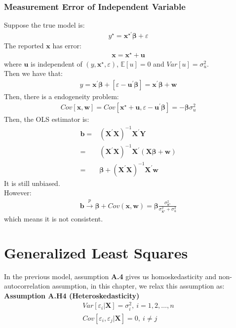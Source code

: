 \documentclass{article}
\begin{document}
\subsubsection{Measurement Error of Independent Variable}
Suppose the true model is:
	\begin{align*}
		y^\star = \boldsymbol{x}^{\star\prime} \boldsymbol{\beta} + \varepsilon
	\end{align*}
The reported $\boldsymbol{x}$ has error:
	\begin{align*}
		\boldsymbol{x} = \boldsymbol{x}^\star + \boldsymbol{u}
	\end{align*}
where $\boldsymbol{u}$ is independent of $(y, \boldsymbol{x}^\star, \varepsilon)$, $\mathbb{E}[u] = 0$ and $Var[u] = \sigma^2_u$.\\
Then we have that:
	\begin{align*}
		y = \boldsymbol{x}^\prime \boldsymbol{\beta} + [\varepsilon - \boldsymbol{u}^\prime \boldsymbol{\beta}] = \boldsymbol{x}^\prime \boldsymbol{\beta} + \boldsymbol{w}
	\end{align*}
Then, there is a endogeneity problem:
	\begin{align*}
		Cov[\boldsymbol{x}, \boldsymbol{w}] = Cov[\boldsymbol{x}^\star + \boldsymbol{u}, \varepsilon - \boldsymbol{u}^\prime \boldsymbol{\beta}] = -\boldsymbol{\beta} \sigma^2_u
	\end{align*}
Then, the OLS estimator is:
	\begin{align*}
		\boldsymbol{b} = &(\boldsymbol{X}^\prime \boldsymbol{X})^{-1} \boldsymbol{X}^\prime \boldsymbol{Y}\\ = &
		(\boldsymbol{X}^\prime \boldsymbol{X})^{-1} \boldsymbol{X}^\prime (\boldsymbol{X} \boldsymbol{\beta} + \boldsymbol{w})\\ = &
		\boldsymbol{\beta} + (\boldsymbol{X}^\prime \boldsymbol{X})^{-1} \boldsymbol{X}^\prime \boldsymbol{w}
	\end{align*}
It is still unbiased.\\
However:
	\begin{align*}
		\boldsymbol{b} \xrightarrow{p} \boldsymbol{\beta} + Cov(\boldsymbol{x}, \boldsymbol{w}) = \boldsymbol{\beta} \frac{\sigma^2_{\boldsymbol{x}^\star}}{\sigma^2_{\boldsymbol{x}^\star} + \sigma^2_u}
	\end{align*}
which means it is not consistent.



\newpage
\section{Generalized Least Squares}
In the previous model, assumption \textbf{A.4} gives us homoskedasticity and non-autocorrelation assumption, in this chapter, we relax this assumption as:\\
\textbf{Assumption A.H4 (Heteroskedasticity)}
	\begin{align*}
		Var[\varepsilon_i | \boldsymbol{X}] = \sigma^2_i,\ i = 1, 2, \ldots, n\\
		Cov[\varepsilon_i, \varepsilon_j | \boldsymbol{X}] = 0,\ i \neq j		
	\end{align*}
\end{document}
